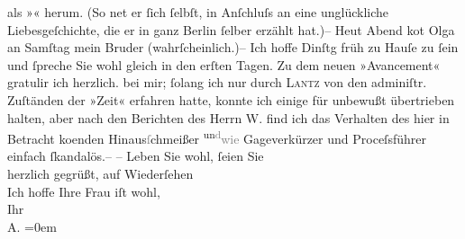 \begin{ledgroupsized}[t]{13cm}
               als »\label{K_L02980-1v}\label{K_L02980-1h}« herum. (So ne{\geminationn}t er ſich ſelbſt, in Anſchluſs an
               eine \introOben{}unglückliche\introOben{} Liebesgeſchichte, die er in ganz Berlin ſelber erzählt hat.)– Heut Abend ko{\geminationm}t Olga an {\pb}Samſtag mein Bruder (wahrſcheinlich.)– Ich hoffe Dinſtg
               früh zu Hauſe zu ſein und ſpreche Sie wohl gleich in den erſten Tagen. Zu dem neuen
               »Avancement« gratulir ich herzlich. \label{K_L02980-64v}\label{K_L02980-64h} bei mir; ſolang ich nur durch \textsc{Lantz} von den adminiſtr. Zuſtänden der »Zeit«
               erfahren hatte, konnte ich einige für {\pb}unbewußt übertrieben halten, aber nach den Berichten des Herrn W. find ich das Verhalten des hier in Betracht ko{\geminationm}enden Hinaus\textcolor{gray}{ſ}chmeißer \substVorne{}\textsuperscript{un\textcolor{gray}{d}}\substDazwischen{}\textcolor{gray}{wie}\substHinten{} Gageverkürzer und Proceſsführer einfach ſkandalös.– \pend
           \pstart
           – Leben Sie wohl, ſeien Sie {\\[\baselineskip]}herzlich gegrüßt, auf Wiederſehen {\\[\baselineskip]}Ich
               hoffe Ihre Frau iſt wohl,
               {\\[\baselineskip]}Ihr {\\[\baselineskip]}\spacefill\mbox{A.}\pend
           \leftskip=0em{}
         
         \endnumbering{}\end{ledgroupsized}\begin{anhang}\end{anhang}\newcommand{\dateiname}{L02980}\newcommand{\titel}{Arthur Schnitzler an Felix Salten, 4. 3. 1903}\newcommand{\editorInnen}{Martin Anton Müller und Laura Untner}
      